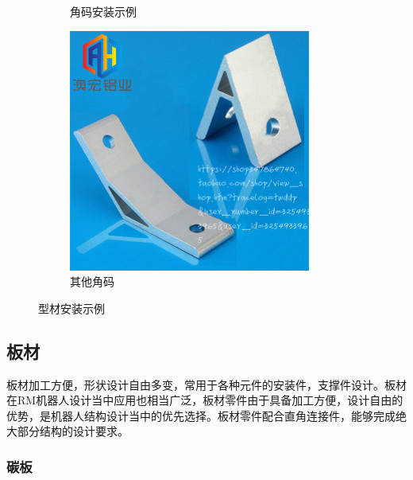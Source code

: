 \documentclass[UTF8]{article} %
\begin{document}
\begin{itemize}
\begin{figure}[H]
\begin{subfigure}[b]{0.3\textwidth}
            \caption{角码安装示例}
    \end{subfigure}
    \begin{subfigure}[b]{0.3\textwidth}
      \centering
      \includegraphics[width=\textwidth]{chaun3.png}
      \caption{其他角码}
    \end{subfigure}
    \caption{型材安装示例}
    \label{xing}
  \end{figure}
\end{itemize}

\subsection{板材}
板材加工方便，形状设计自由多变，常用于各种元件的安装件，支撑件设计。板材在RM机器人设计当中应用也相当广泛，板材零件由于具备加工方便，设计自由的优势，是机器人结构设计当中的优先选择。板材零件配合直角连接件，能够完成绝大部分结构的设计要求。

\subsubsection{碳板}
\end{document}
